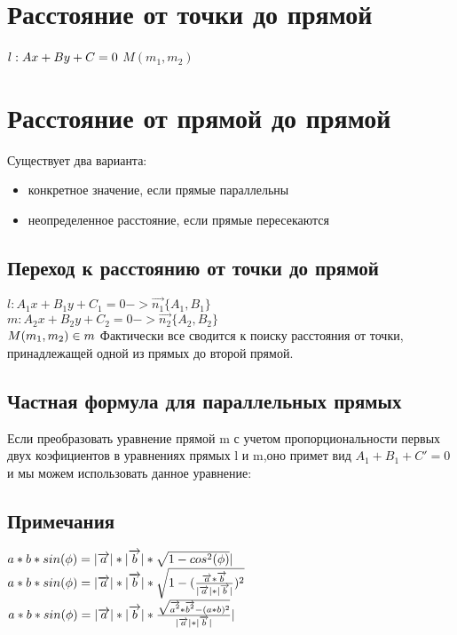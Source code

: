 \documentclass{book}
\begin{document}
\section{Расстояние от точки до прямой}
$l: Ax+By+C=0\\$
$M(m_1,m_2)$
\section{Расстояние от прямой до прямой}
Существует два варианта:
\begin{itemize}
    \item конкретное значение, если прямые параллельны
    \item неопределенное расстояние, если прямые пересекаются
\end{itemize}
\subsection{Переход к расстоянию от точки до прямой}
$l: A_1x+B_1y+C_1=0 -> \overrightarrow{n_1}\{A_1,B_1\}$\\
$m: A_2x+B_2y+C_2=0 -> \overrightarrow{n_2}\{A_2,B_2\}$\\
$M(m_1,m_2) \in m\\$
Фактически все сводится к поиску расстояния от точки, принадлежащей одной из прямых до второй прямой.
\subsection{Частная формула для параллельных прямых}
Если преобразовать уравнение прямой m с учетом пропорциональности первых двух коэфициентов в уравнениях прямых l и m,оно примет вид $A_1+B_1+C'=0$ и мы можем использовать данное уравнение:\\
\subsection{Примечания}
$a*b*sin(\phi)=|\overrightarrow{a}|*|\overrightarrow{b}|*\sqrt{1-cos^2(\phi)}|\\$
$a*b*sin(\phi)=|\overrightarrow{a}|*|\overrightarrow{b}|*\sqrt{1-(\frac{\overrightarrow{a}*\overrightarrow{b}}{|\overrightarrow{a}|*|\overrightarrow{b}|})^2}\\$
$a*b*sin(\phi)=|\overrightarrow{a}|*|\overrightarrow{b}|*\frac{\sqrt{\overrightarrow{a^2}*\overrightarrow{b^2}-(a*b)^2}}{|\overrightarrow{a}|*|\overrightarrow{b}|}|\\$
\end{document}
